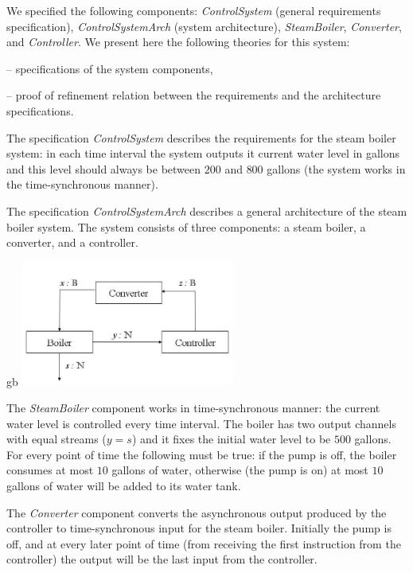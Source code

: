 We specified the following components: \emph{ControlSystem} (general requirements specification), 
\emph{ControlSystemArch} (system architecture),  
\emph{SteamBoiler}, \emph{Converter}, and \emph{Controller}. 
We present here the following \isah theories for this system:
\begin{itemize*} 
	\item {} --  specifications of the system components, 
	\item {} --  proof of refinement relation between the requirements and the architecture specifications.
\end{itemize*}
%
The specification \emph{ControlSystem} describes  
the requirements for the steam boiler system: 
in each time interval the system outputs it current water level in gallons
 and this level should always be between $200$ and $800$ gallons 
 (the system works in the  time-synchronous manner). 
 
The specification \emph{ControlSystemArch} describes a general  
architecture of the steam boiler system. 
The system consists of three components: a steam boiler,
a converter, and a controller. 

{\footnotesize
\begin{spec}{}{gb}
\centering
\includegraphics[width=7cm]{fig/BoilerSystemArch.jpg}
\end{spec}
}

The  \emph{SteamBoiler}  component works in time-synchronous manner: 
the current water level is controlled every time interval.
The boiler has two output channels with equal streams ($y = s$) and it
 fixes the initial water level to be $500$ gallons.
For every point of time the following must be true: if the pump is off, 
the boiler consumes at most $10$ gallons of water, 
otherwise (the pump is on) at most $10$ gallons of water will be added to its water tank.

The  \emph{Converter}   component converts the asynchronous output produced by the controller
to time-synchronous input for the steam boiler. 
Initially the pump is off, 
and at every later point of time (from receiving the first instruction 
from the controller) the output will be the last input from the controller. 

